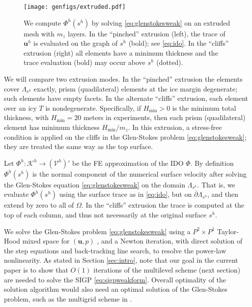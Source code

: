 \documentclass[letterpaper,final,12pt,reqno]{amsart}
\theoremstyle{claim}
\newcommand{\bu}{\mathbf{u}}
\numberwithin{equation}{section}
\numberwithin{figure}{section}
\numberwithin{table}{section}
\numberwithin{theorem}{section}
\begin{document}
\begin{figure}[t]
\begin{center}
\texttt{[image: genfigs/extruded.pdf]}
\end{center}
\caption{We compute $\Phi^h(s^h)$ by solving \eqref{eq:glenstokesweak} on an extruded mesh with $m_z$ layers.  In the ``pinched'' extrusion (left), the trace of $\bu^h$ is evaluated on the graph of $s^h$ (bold); see \eqref{eq:ido}.  In the ``cliffs'' extrusion (right) all elements have a minimum thickness and the trace evaluation (bold) may occur above $s^h$ (dotted).}
\label{fig:extruded}
\end{figure}

We will compare two extrusion modes.  In the ``pinched'' extrusion the elements cover $\Lambda_{s^h}$ exactly, prism (quadilateral) elements at the ice margin degenerate; such elements have empty facets.  In the alternate ``cliffs'' extrusion, each element over an icy $T$ is nondegenerate.  Specifically, if $H_{\text{min}} > 0$ is the minimum total thickness, with $H_{\text{min}} = 20$ meters in experiments, then each prism (quadilateral) element has minimum thickness $H_{\text{min}}/m_z$.  In this extrusion, a stress-free condition is applied on the cliffs  in the Glen-Stokes problem \eqref{eq:glenstokesweak}; they are treated the same way as the top surface.

Let $\Phi^h:\mathcal{K}^h \to (\mathcal{V}^h)'$ be the FE approximation of the IDO $\Phi$.  By definition $\Phi^h(s^h)$ is the normal component of the numerical surface velocity after solving the Glen-Stokes equation \eqref{eq:glenstokesweak} on the domain $\Lambda_{s^h}$.  That is, we evaluate $\Phi^h(s^h)$ using the surface trace as in \eqref{eq:ido}, but on $\overline{\partial} \Lambda_{s^h}$, and then extend by zero to all of $\Omega$.  In the ``cliffs'' extrusion the trace is computed at the top of each column, and thus not necessarily at the original surface $s^h$.

We solve the Glen-Stokes problem \eqref{eq:glenstokesweak} using a $P^2 \times P^1$ Taylor-Hood mixed space for $(\bu,p)$ \cite{Elmanetal2014}, and a Newton iteration, with direct solution of the step equations and back-tracking line search, to resolve the power-law nonlinearity.  As stated in Section \ref{sec:intro}, note that our goal in the current paper is to show that $O(1)$ iterations of the multilevel scheme (next section) are needed to solve the SIGP \eqref{eq:sigpweakform}.  Overall optimality of the solution algorithm would also need an optimal solution of the Glen-Stokes problem, such as the multigrid scheme in \cite{IsaacStadlerGhattas2015}.
\end{document}
